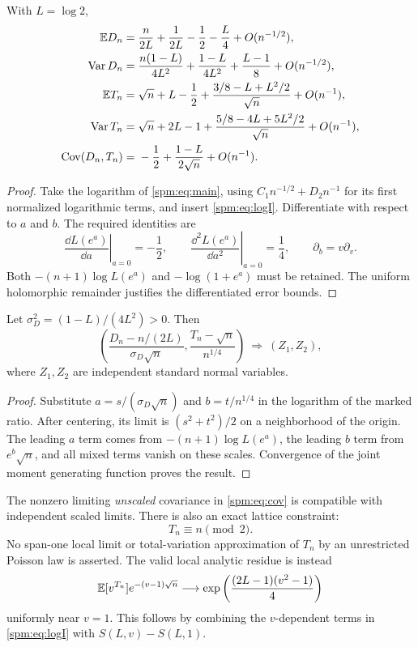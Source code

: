 \begin{proposition}\label{spm:prop:cumulants}
With $L=\log2$,
\begin{align}
 \mathbb E D_n={}&\frac{n}{2L}+\frac1{2L}-\frac12-\frac L4+O(n^{-1/2}),\label{spm:eq:ED}\\
 \operatorname{Var} D_n={}&\frac{n(1-L)}{4L^2}
 +\frac{1-L}{4L^2}+\frac{L-1}{8}+O(n^{-1/2}),\label{spm:eq:VD}\\
 \mathbb E T_n={}&\sqrt n+L-\frac12
 +\frac{3/8-L+L^2/2}{\sqrt n}+O(n^{-1}),\label{spm:eq:ET}\\
 \operatorname{Var} T_n={}&\sqrt n+2L-1
 +\frac{5/8-4L+5L^2/2}{\sqrt n}+O(n^{-1}),\label{spm:eq:VT}\\
 \operatorname{Cov}(D_n,T_n)={}&-\frac12+\frac{1-L}{2\sqrt n}+O(n^{-1}).\label{spm:eq:cov}
\end{align}
\end{proposition}
\begin{proof}
Take the logarithm of \eqref{spm:eq:main}, using
$C_1n^{-1/2}+D_2n^{-1}$ for its first normalized logarithmic terms, and insert \eqref{spm:eq:logI}. Differentiate with respect to $a$ and $b$. The required identities are
\[
 \left.\frac{\dd L(e^a)}{\dd a}\right|_{a=0}=-\frac12,
 \qquad
 \left.\frac{\dd^2 L(e^a)}{\dd a^2}\right|_{a=0}=\frac14,
 \qquad \partial_b=v\partial_v.
\]
Both $-(n+1)\log L(e^a)$ and $-\log(1+e^a)$ must be retained. The uniform holomorphic remainder justifies the differentiated error bounds.
\end{proof}

\begin{theorem}\label{spm:thm:gaussian}
Let $\sigma_D^2=(1-L)/(4L^2)>0$. Then
\begin{equation}\label{spm:eq:gaussian}
 \left(\frac{D_n-n/(2L)}{\sigma_D\sqrt n},
       \frac{T_n-\sqrt n}{n^{1/4}}\right)
 \ \Longrightarrow\ (Z_1,Z_2),
\end{equation}
where $Z_1,Z_2$ are independent standard normal variables.
\end{theorem}
\begin{proof}
Substitute $a=s/(\sigma_D\sqrt n)$ and $b=t/n^{1/4}$ in the logarithm of the marked ratio. After centering, its limit is $(s^2+t^2)/2$ on a neighborhood of the origin. The leading $a$ term comes from $-(n+1)\log L(e^a)$, the leading $b$ term from $e^b\sqrt n$, and all mixed terms vanish on these scales. Convergence of the joint moment generating function proves the result.
\end{proof}

The nonzero limiting \emph{unscaled} covariance in \eqref{spm:eq:cov} is compatible with independent scaled limits. There is also an exact lattice constraint:
\begin{equation}\label{spm:eq:parity}
 T_n\equiv n\pmod2.
\end{equation}
No span-one local limit or total-variation approximation of $T_n$ by an unrestricted Poisson law is asserted. The valid local analytic residue is instead
\begin{equation}\label{spm:eq:trace-residue}
 \mathbb E[v^{T_n}]e^{-(v-1)\sqrt n}
 \longrightarrow \exp\left(\frac{(2L-1)(v^2-1)}4\right)
\end{equation}
uniformly near $v=1$. This follows by combining the $v$-dependent terms in \eqref{spm:eq:logI} with $S(L,v)-S(L,1)$.
